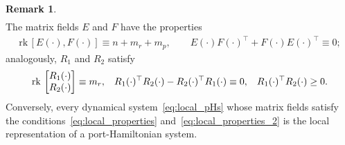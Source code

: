 \documentclass[preprint,12pt]{elsarticle}
\theoremstyle{definition}
\newtheorem{remark}[theorem]{Remark}
\newcommand{\rk}{\mathrm{rk}\,}
\begin{document}
\begin{remark}
\begin{align}
\end{align}
The matrix fields $E$ and $F$ have the properties
\begin{align}\label{eq:local_properties}
\rk [E(\cdot),F(\cdot)] \equiv n+m_r+m_p,\qquad E(\cdot)F(\cdot)^\top+F(\cdot)E(\cdot)^\top\equiv 0;
\end{align}
analogously, $R_1$ and $R_2$ satisfy
\begin{align}\label{eq:local_properties_2}
\rk\begin{bmatrix}
R_1(\cdot)\\R_2(\cdot)
\end{bmatrix}\equiv m_r,\hspace*{3mm} R_1(\cdot)^\top R_2(\cdot)-R_2(\cdot)^\top R_1(\cdot)\equiv 0,\hspace*{3mm} R_1(\cdot)^\top R_2(\cdot)\geq 0.
\end{align}
Conversely, every dynamical system~\eqref{eq:local_pHs} whose matrix fields satisfy the conditions~\eqref{eq:local_properties} and~\eqref{eq:local_properties_2} is the local representation of a port-Hamiltonian system.
\end{remark}
\end{document}
